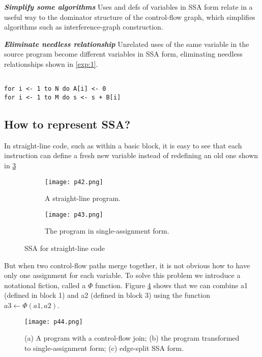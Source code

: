 \textbf{ \large \textit{Simplify some algorithms}} Uses and defs of variables in SSA form relate in a useful way to the dominator structure of the control-flow graph, which simplifies algorithms such as interference-graph construction.


\textbf{ \large \textit{Eliminate needless relationship}} Unrelated uses of the same variable in the source program become different variables in SSA form, eliminating needless relationships shown in \ref{exp:1}.

\begin{lstlisting}[label={exp:1},caption={An example}]

for i <- 1 to N do A[i] <- 0
for i <- 1 to M do s <- s + B[i]

\end{lstlisting}


\subsection{How to represent SSA?}

In straight-line code, such as within a basic block, it is easy to see that each instruction can define a fresh new variable instead of redefining an old one shown in \ref{fig:p42-43}


\begin{figure}[htb]
	\centering
	\begin{subfigure}{0.2\textwidth}
		\centering
		\texttt{[image: p42.png]}
		\caption{A straight-line program.}
		\label{fig:p42}
	\end{subfigure}
	\begin{subfigure}{0.25\textwidth}
		\centering
		\texttt{[image: p43.png]}
		\caption{The program in single-assignment form.}
		\label{fig:p43}
	\end{subfigure}
	\caption{SSA for straight-line code}
	\label{fig:p42-43}
\end{figure}


But when two control-flow paths merge together, it is not obvious how to have only one assignment for each variable. To solve this problem we introduce a notational fiction, called a $\Phi$ function. Figure \ref{fig:p44} shows that we can combine a1 (defined in block 1) and a2 (defined in block 3) using the function $a3 \leftarrow \Phi(a1, a2)$.


\begin{figure}[htb]
	\centering
	\texttt{[image: p44.png]}
	\caption{(a) A program with a control-flow join; (b) the program transformed to single-assignment form; (c) edge-split SSA form.}
	\label{fig:p44}
\end{figure}


